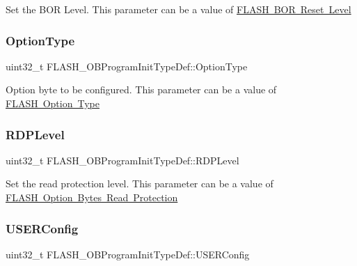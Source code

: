 Set the B\+OR Level. This parameter can be a value of \mbox{\hyperlink{group___f_l_a_s_h_ex___b_o_r___reset___level}{F\+L\+A\+SH B\+OR Reset Level}} \mbox{\label{struct_f_l_a_s_h___o_b_program_init_type_def_a46bffc2a63ea02e15b9187856535d890}} 
\subsubsection{\texorpdfstring{OptionType}{OptionType}}
{\footnotesize\ttfamily uint32\+\_\+t F\+L\+A\+S\+H\+\_\+\+O\+B\+Program\+Init\+Type\+Def\+::\+Option\+Type}

Option byte to be configured. This parameter can be a value of \mbox{\hyperlink{group___f_l_a_s_h_ex___option___type}{F\+L\+A\+SH Option Type}} \mbox{\label{struct_f_l_a_s_h___o_b_program_init_type_def_a1f613ba2b87cf9caa84dc1d493e96dae}} 
\subsubsection{\texorpdfstring{RDPLevel}{RDPLevel}}
{\footnotesize\ttfamily uint32\+\_\+t F\+L\+A\+S\+H\+\_\+\+O\+B\+Program\+Init\+Type\+Def\+::\+R\+D\+P\+Level}

Set the read protection level. This parameter can be a value of \mbox{\hyperlink{group___f_l_a_s_h_ex___option___bytes___read___protection}{F\+L\+A\+SH Option Bytes Read Protection}} \mbox{\label{struct_f_l_a_s_h___o_b_program_init_type_def_aeee4c65d539a25d8bfc7f83c7dc29012}} 
\subsubsection{\texorpdfstring{USERConfig}{USERConfig}}
{\footnotesize\ttfamily uint32\+\_\+t F\+L\+A\+S\+H\+\_\+\+O\+B\+Program\+Init\+Type\+Def\+::\+U\+S\+E\+R\+Config}

